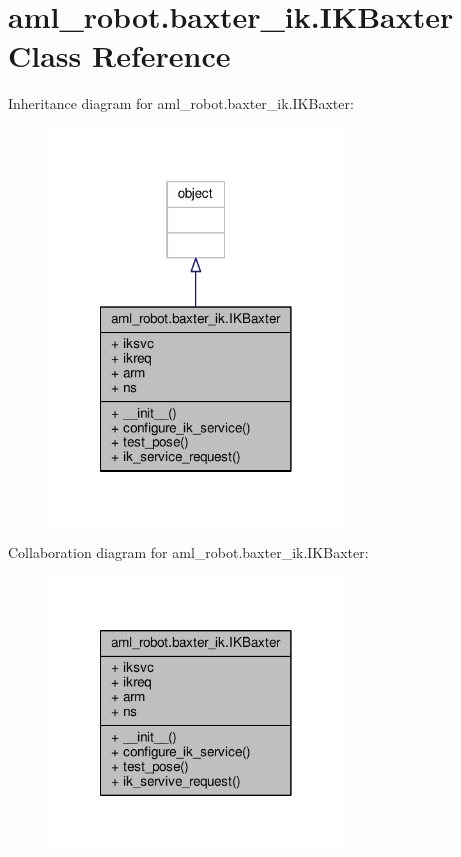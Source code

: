 \hypertarget{classaml__robot_1_1baxter__ik_1_1_i_k_baxter}{\section{aml\-\_\-robot.\-baxter\-\_\-ik.\-I\-K\-Baxter Class Reference}
\label{classaml__robot_1_1baxter__ik_1_1_i_k_baxter}
}


Inheritance diagram for aml\-\_\-robot.\-baxter\-\_\-ik.\-I\-K\-Baxter\-:
\nopagebreak
\begin{figure}[H]
\begin{center}
\leavevmode
\includegraphics[width=222pt]{classaml__robot_1_1baxter__ik_1_1_i_k_baxter__inherit__graph}
\end{center}
\end{figure}


Collaboration diagram for aml\-\_\-robot.\-baxter\-\_\-ik.\-I\-K\-Baxter\-:
\nopagebreak
\begin{figure}[H]
\begin{center}
\leavevmode
\includegraphics[width=222pt]{classaml__robot_1_1baxter__ik_1_1_i_k_baxter__coll__graph}
\end{center}
\end{figure}
